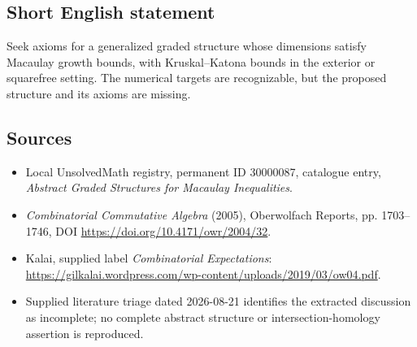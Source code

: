 \documentclass[11pt]{article}
\begin{document}
\subsection{Short English statement}
Seek axioms for a generalized graded structure whose dimensions satisfy Macaulay growth bounds, with Kruskal--Katona bounds in the exterior or squarefree setting. The numerical targets are recognizable, but the proposed structure and its axioms are missing.
\subsection{Sources}
\begin{itemize}
\item Local UnsolvedMath registry, permanent ID 30000087, catalogue entry, \emph{Abstract Graded Structures for Macaulay Inequalities}.
\item \emph{Combinatorial Commutative Algebra} (2005), Oberwolfach Reports, pp. 1703--1746, DOI \url{https://doi.org/10.4171/owr/2004/32}.
\item Kalai, supplied label \emph{Combinatorial Expectations}: \url{https://gilkalai.wordpress.com/wp-content/uploads/2019/03/ow04.pdf}.
\item Supplied literature triage dated 2026-08-21 identifies the extracted discussion as incomplete; no complete abstract structure or intersection-homology assertion is reproduced.
\end{itemize}
\end{document}

